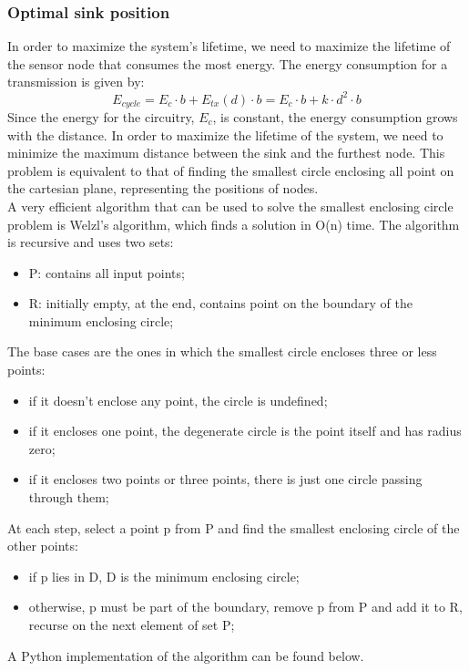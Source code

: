 \subsubsection{Optimal sink position}
In order to maximize the system's lifetime, we need to maximize the lifetime of the sensor node that consumes the most energy. The energy consumption for a transmission is given by:
\[
E_{cycle} = E_c \cdot b + E_{tx}(d) \cdot b = E_c \cdot b + k \cdot d^2 \cdot b
\]
Since the energy for the circuitry, $E_c$, is constant, the energy consumption grows with the distance. In order to maximize the lifetime of the system, we need to minimize the maximum distance between the sink and the furthest node. This problem is equivalent to that of finding the smallest circle enclosing all point on the cartesian plane, representing the positions of nodes.\\
A very efficient algorithm that can be used to solve the smallest enclosing circle problem is Welzl's algorithm, which finds a solution in O(n) time. 
The algorithm is recursive and uses two sets:
\begin{itemize}
	\item P: contains all input points;
	\item R: initially empty, at the end, contains point on the boundary of the minimum enclosing circle;
\end{itemize}
The base cases are the ones in which the smallest circle encloses three or less points:
\begin{itemize}
	\item if it doesn't enclose any point, the circle is undefined;
	\item if it encloses one point, the degenerate circle is the point itself and has radius zero;
	\item if it encloses two points or three points, there is just one circle passing through them;
\end{itemize}
At each step, select a point p from P and find the smallest enclosing circle of the other points:
\begin{itemize}
	\item  if p lies in D, D is the minimum enclosing circle;
	\item otherwise, p must be part of the boundary, remove p from P and add it to R, recurse on the next element of set P;
\end{itemize}
A Python implementation of the algorithm can be found below.

